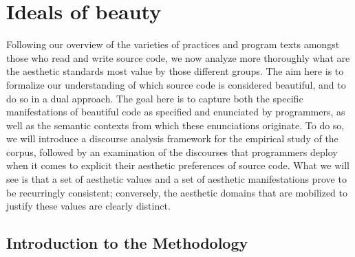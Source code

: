 \section{Ideals of beauty}
\label{sec:ideals-beauty}

Following our overview of the varieties of practices and program texts amongst those who read and write source code, we now analyze more thoroughly what are the aesthetic standards most value by those different groups. The aim here is to formalize our understanding of which source code is considered beautiful, and to do so in a dual approach. The goal here is to capture both the specific manifestations of beautiful code as specified and enunciated by programmers, as well as the semantic contexts from which these enunciations originate. To do so, we will introduce a discourse analysis framework for the empirical study of the corpus, followed by an examination of the discourses that programmers deploy when it comes to explicit their aesthetic preferences of source code. What we will see is that a set of aesthetic values and a set of aesthetic manifestations prove to be recurringly consistent; conversely, the aesthetic domains that are mobilized to justify these values are clearly distinct.

\subsection{Introduction to the Methodology}
\label{subsec:ideals-methodology}

